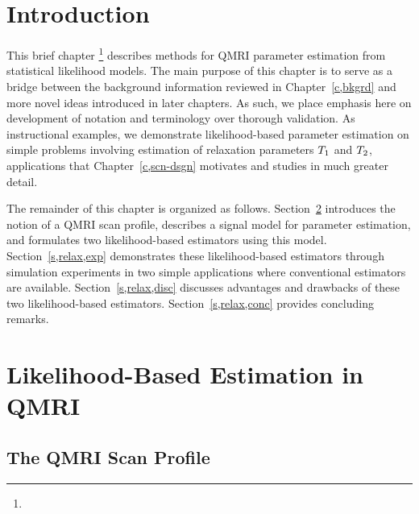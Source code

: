 
\section{Introduction}
\label{s,relax,intro}

This brief chapter
\footnote{%
%
}
describes methods
for QMRI parameter estimation
from statistical likelihood models.
The main purpose of this chapter
is to serve as a bridge 
between the background information
reviewed in Chapter~\ref{c,bkgrd}
and more novel ideas 
introduced in later chapters.
As such, 
we place emphasis here
on development of notation and terminology
over thorough validation.
As instructional examples,
we demonstrate likelihood-based parameter estimation
on simple problems
involving estimation 
of relaxation parameters $T_1$ and $T_2$,
applications
that Chapter~\ref{c,scn-dsgn} motivates and studies 
in much greater detail.

The remainder of this chapter 
is organized as follows.
Section~\ref{s,relax,meth}
introduces the notion of a QMRI scan profile,
describes a signal model for parameter estimation,
and formulates two likelihood-based estimators
using this model.
Section~\ref{s,relax,exp}
demonstrates these likelihood-based estimators
through simulation experiments
in two simple applications
where conventional estimators are available.
Section~\ref{s,relax,disc} 
discusses advantages and drawbacks 
of these two likelihood-based estimators.
Section~\ref{s,relax,conc} 
provides concluding remarks.

\section{Likelihood-Based Estimation in QMRI}
\label{s,relax,meth}

\subsection{The QMRI Scan Profile}
\label{ss,relax,meth,prof}

